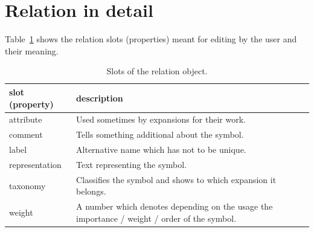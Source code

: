 \documentclass[a4paper, 12pt, openany]{scrbook}
\begin{document}
\section{Relation in detail}
Table~\ref{tab:relation} shows the relation slots (properties) meant for editing by the user and their meaning.
\begin{table}[htbp]
\centering
\begin{tabular}{|p{4cm}|p{12cm}|}
  \hline
  \textbf{slot (property)} & \textbf{description} \\
  \hline
  attribute & Used sometimes by expansions for their work. \\
  \hline
  comment & Tells something additional about the symbol. \\
  \hline
  label & Alternative name which has not to be unique. \\
  \hline
  representation & Text representing the symbol. \\
  \hline
  taxonomy & Classifies the symbol and shows to which expansion it belongs. \\
  \hline
  weight & A number which denotes depending on the usage the importance / weight / order of the symbol. \\
  \hline
\end{tabular}
\caption{Slots of the relation object.}
\label{tab:relation}
\end{table}
\end{document}
